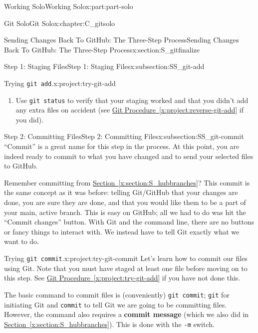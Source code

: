\documentclass[oneside,10pt,]{book}
\newcommand{\blocktitlefont}{\relax}
\newcommand{\xreffont}{\relax}
\newcommand{\mono}[1]{\texttt{#1}}
\newcommand{\terminology}[1]{\textbf{#1}}
\begin{document}
\begin{partptx}{Working Solo}{}{Working Solo}{}{}{x:part:part-solo}
\begin{chapterptx}{Git Solo}{}{Git Solo}{}{}{x:chapter:C_gitsolo}
\begin{sectionptx}{Sending Changes Back To GitHub: The Three-Step Process}{}{Sending Changes Back To GitHub: The Three-Step Process}{}{}{x:section:S_gitfinalize}
\begin{subsectionptx}{Step 1: Staging Files}{}{Step 1: Staging Files}{}{}{x:subsection:SS_git-add}
\begin{project}{Trying \mono{git add}.}{x:project:try-git-add}
\begin{enumerate}[font=\bfseries,label=(\alph*),ref=\alph*]
\par\smallskip%
\noindent\textbf{\blocktitlefont Hint}.\hypertarget{g:hint:idp616225416}{}\quad{}Case 1 or Case 3 will work in this instance.%
\item{}Use \mono{git status} to verify that your staging worked and that you didn't add any extra files on accident (see \hyperref[x:project:reverse-git-add]{Git Procedure~{\xreffont\ref{x:project:reverse-git-add}}} if you did).%
\end{enumerate}
\end{project}%
\end{subsectionptx}
%
%
\typeout{************************************************}
\typeout{************************************************}
%
\begin{subsectionptx}{Step 2: Committing Files}{}{Step 2: Committing Files}{}{}{x:subsection:SS_git-commit}
%
%
%
%
``Commit'' is a great name for this step in the process. At this point, you are indeed ready to commit to what you have changed and to send your selected files to GitHub.%
\par
Remember committing from \hyperref[x:section:S_hubbranches]{Section~{\xreffont\ref{x:section:S_hubbranches}}}? This commit is the same concept as it was before: telling Git\slash{}GitHub that your changes are done, you are sure they are done, and that you would like them to be a part of your main, active branch. This is easy on GitHub; all we had to do was hit the ``Commit changes'' button. With Git and the command line, there are no buttons or fancy things to interact with. We instead have to tell Git exactly what we want to do.%
\begin{project}{Trying \mono{git commit}.}{x:project:try-git-commit}%
Let's learn how to commit our files using Git. Note that you must have staged at least one file before moving on to this step. See \hyperref[x:project:try-git-add]{Git Procedure~{\xreffont\ref{x:project:try-git-add}}} if you have not done this.%
\par
The basic command to commit files is (conveniently) \mono{git commit}; \mono{git} for initiating Git and \mono{commit} to tell Git we are going to be committing files. However, the command also requires a \terminology{commit message} (which we also did in \hyperref[x:section:S_hubbranches]{Section~{\xreffont\ref{x:section:S_hubbranches}}}). This is done with the \mono{-m} switch.%
\begin{enumerate}[font=\bfseries,label=(\alph*),ref=\alph*]

\end{enumerate}
\end{project}
\end{subsectionptx}
\end{sectionptx}
\end{chapterptx}
\end{partptx}
\end{document}
